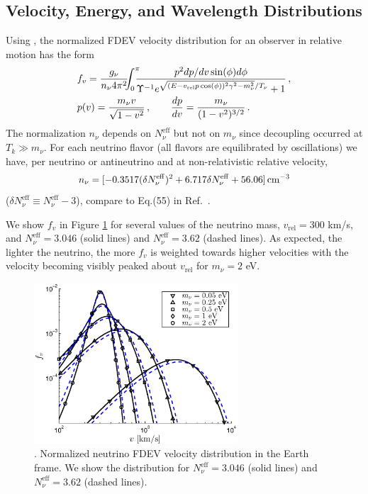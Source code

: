 \subsection{Velocity, Energy, and Wavelength Distributions}

Using , the normalized FDEV velocity distribution for an observer in relative motion has the form
\begin{align} \label{fvdistrib}
&f_v=\frac{g_\nu}{n_\nu 4\pi^2}\!\!\!\int_0^\pi \!\!\!\!\frac{ p^2dp/dv\sin(\phi) d\phi}{\Upsilon^{-1}e^{\sqrt{( E-v_{\text{rel}} p \cos(\phi))^2\gamma^2-m_\nu^2}/T_\nu}+1}\,,\notag\\
&p(v)=\frac{m_\nu v}{\sqrt{1-v^2}}\,,\qquad \frac{dp}{dv}=\frac{m_\nu}{(1-v^2)^{3/2}}\,.
\end{align}
The normalization $n_\nu$ depends on $N_\nu^{\mathrm{eff}}$ but not on $m_\nu$ since decoupling occurred at $T_k\gg m_\nu$. For each neutrino flavor (all flavors are equilibrated by oscillations) we have, per neutrino or antineutrino and at non-relativistic relative velocity,
\begin{equation}\label{nnu}
n_\nu=[-0.3517(\delta N_\nu^{\mathrm{eff}})^2+6.717\delta N_\nu^{\mathrm{eff}}+56.06]\,{\rm cm}^{-3}
\end{equation}
($\delta N_\nu^{\mathrm{eff}}\equiv N_\nu^{\mathrm{eff}}-3$), compare to Eq.(55) in Ref.~\cite{Birrell:2013_2}.

We show $f_v$ in Figure \ref{fig:rel_v_dist_300}   for several values of the neutrino mass, $v_{\text{rel}}=300$ km/s, and $N_\nu^{\mathrm{eff}}=3.046$ (solid lines) and $N_\nu^{\mathrm{eff}}=3.62$ (dashed lines). As expected, the lighter the neutrino, the more $f_v$  is weighted towards higher velocities with the velocity becoming visibly peaked about $v_{\text{rel}}$ for $m_\nu=2$ eV. 
\begin{figure}%
\centerline{\includegraphics[height=6cm]{04-birrell/NeutrinoDistributionToday/Figures/rel_v_dist_300.eps}}
\caption{. Normalized neutrino FDEV velocity distribution in the Earth frame. We show the distribution for $N_\nu^{\mathrm{eff}}=3.046$ (solid lines) and $N_\nu^{\mathrm{eff}}=3.62$ (dashed lines).}\label{fig:rel_v_dist_300}
 \end{figure}

